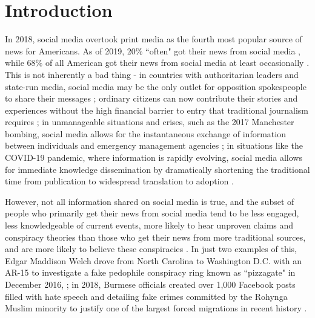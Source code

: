 \documentclass[preprint,review,12pt]{elsarticle}
\begin{document}
\section{Introduction}
\label{introduction}
 In 2018, social media overtook print media as the fourth most popular source of news for Americans. As of 2019, 20\% ``often" got their news from social media \cite{shearer2018social}, while 68\% of all American got their news from social media at least occasionally \cite{matsa2018news}. This is not inherently a bad thing - in countries with authoritarian leaders and state-run media, social media may be the only outlet for opposition spokespeople to share their messages \cite{walker2014breaking}; ordinary citizens can now contribute their stories and experiences without the high financial barrier to entry that traditional journalism requires \cite{qualman2012socialnomics, tapscott2008wikinomics}; in unmanageable situations and crises, such as the 2017 Manchester bombing, social media allows for the instantaneous exchange of information between individuals and emergency management agencies \cite{mirbabaie2020breaking, eriksson2016facebook}; in situations like the COVID-19 pandemic, where information is rapidly evolving, social media allows for immediate knowledge dissemination by dramatically shortening the traditional time from publication to widespread translation to adoption \cite{chan2020social}. 
 
However, not all information shared on social media is true, and the subset of people who primarily get their news from social media tend to be less engaged, less knowledgeable of current events, more likely to hear unproven claims and conspiracy theories than those who get their news from more traditional sources, and are more likely to believe these conspiracies \cite{mitchell2020americans}. In just two examples of this, Edgar Maddison Welch drove from North Carolina to Washington D.C. with an AR-15 to investigate a fake pedophile conspiracy ring known as ``pizzagate" in December 2016, \cite{goldman2016comet}; in 2018, Burmese officials created over 1,000 Facebook posts filled with hate speech and detailing fake crimes committed by the Rohynga Muslim minority to justify one of the largest forced migrations in recent history \cite{subedar2018country}.
\end{document}
